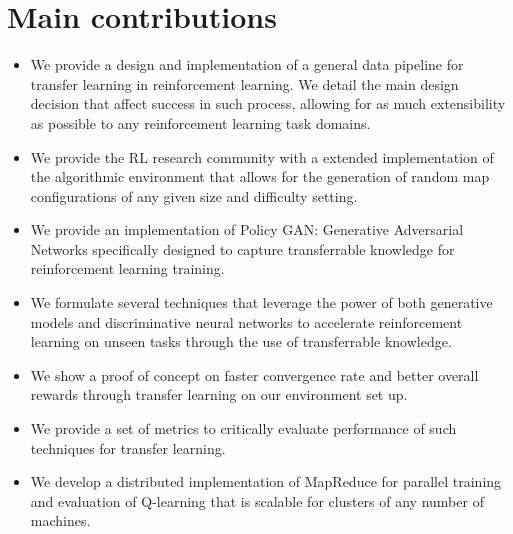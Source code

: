 \section{Main contributions}
\begin{itemize}
	\item We provide a design and implementation of a general data pipeline for transfer learning in reinforcement learning. We detail the main design decision that affect success in such process, allowing for as much extensibility as possible to any reinforcement learning task domains.
	\item We provide the RL research community with a extended implementation of the  algorithmic environment that allows for the generation of random map configurations of any given size and difficulty setting.
	\item We provide an implementation of Policy GAN: Generative Adversarial Networks specifically designed to capture transferrable knowledge for reinforcement learning training.
	\item We formulate several techniques that leverage the power of both generative models and discriminative neural networks to accelerate reinforcement learning on unseen tasks through the use of transferrable knowledge.
	\item We show a proof of concept on faster convergence rate and better overall rewards through transfer learning on our environment set up.
	\item We provide a set of metrics to critically evaluate performance of such techniques for transfer learning.
	\item We develop a distributed implementation of MapReduce for parallel training and evaluation of Q-learning that is scalable for clusters of any number of machines.
\end{itemize}
